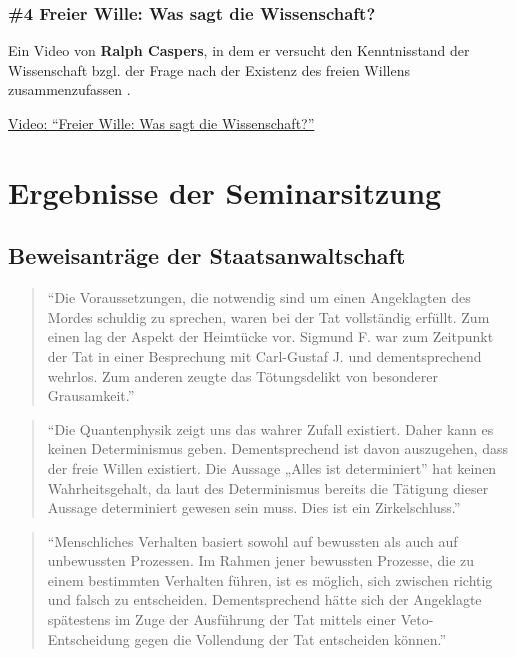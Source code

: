 \documentclass[
  a4paper,
]{report}
\begin{document}
\hypertarget{def-expert-ev4}{%
\subsection{\#4 Freier Wille: Was sagt die Wissenschaft?}\label{def-expert-ev4}}

Ein Video von \textbf{Ralph Caspers}, in dem er versucht den Kenntnisstand der Wissenschaft bzgl. der Frage nach der Existenz des freien Willens zusammenzufassen \citep{Caspers2021}.

\href{https://www.youtube.com/watch?v=45Iut50Cm_Q}{Video: ``Freier Wille: Was sagt die Wissenschaft?''}

\hypertarget{results}{%
\chapter{Ergebnisse der Seminarsitzung}\label{results}}

\hypertarget{pr-ev}{%
\section{Beweisanträge der Staatsanwaltschaft}\label{pr-ev}}

\begin{quote}
``Die Voraussetzungen, die notwendig sind um einen Angeklagten des Mordes schuldig zu sprechen, waren bei der Tat vollständig erfüllt. Zum einen lag der Aspekt der Heimtücke vor. Sigmund F. war zum Zeitpunkt der Tat in einer Besprechung mit Carl-Gustaf J. und dementsprechend wehrlos. Zum anderen zeugte das Tötungsdelikt von besonderer Grausamkeit.''
\end{quote}

\begin{quote}
``Die Quantenphysik zeigt uns das wahrer Zufall existiert. Daher kann es keinen Determinismus geben. Dementsprechend ist davon auszugehen, dass der freie Willen existiert. Die Aussage „Alles ist determiniert'' hat keinen Wahrheitsgehalt, da laut des Determinismus bereits die Tätigung dieser Aussage determiniert gewesen sein muss. Dies ist ein Zirkelschluss.''
\end{quote}

\begin{quote}
``Menschliches Verhalten basiert sowohl auf bewussten als auch auf unbewussten Prozessen. Im Rahmen jener bewussten Prozesse, die zu einem bestimmten Verhalten führen, ist es möglich, sich zwischen richtig und falsch zu entscheiden. Dementsprechend hätte sich der Angeklagte spätestens im Zuge der Ausführung der Tat mittels einer Veto-Entscheidung gegen die Vollendung der Tat entscheiden können.''
\end{quote}
\end{document}
